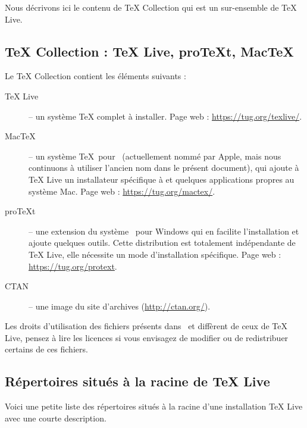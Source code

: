 \documentclass[german, english, french]{article}
\renewcommand{\TL}{\TeX{} Live\xspace}%
\renewcommand{\TK}{\TeX{} Collection\xspace}%
\begin{document}
Nous décrivons ici le contenu de \TK{} qui est un sur-ensemble de \TL.

\subsection {\protect\TK{} : \protect\TL, pro\protect\TeX{}t, Mac\protect\TeX}
\label{sec:tl-coll-dists}

Le \DVD{} \TK{} contient les éléments suivants :

\begin{description}

\item[\TL{}] -- un système \TeX{} complet à installer. Page web :
  \url{https://tug.org/texlive/}.

\item[Mac\TeX] -- un système \TeX\ pour \MacOSX\ (actuellement nommé par Apple,
  mais nous continuons à utiliser l'ancien nom dans le présent document), qui
  ajoute à \TL un installateur spécifique à \MacOSX{} et quelques applications
  propres au système Mac.  Page web : \url{https://tug.org/mactex/}.

\item[pro\TeX{}t] -- une extension du système \MIKTEX\ pour Windows qui en
  facilite l'installation et ajoute quelques outils. Cette distribution est
  totalement indépendante de \TL{}, elle nécessite un mode d'installation
  spécifique.  Page web : \url{https://tug.org/protext}.

\item[CTAN] -- une image du site d'archives \CTAN (\url{http://ctan.org/}).

\end{description}

Les droits d'utilisation des fichiers présents dans \CTAN\ et \ProTeXt{}
diffèrent de ceux de \TL{}, pensez à lire les licences si vous envisagez de
modifier ou de redistribuer certains de ces fichiers.

\subsection{Répertoires situés à la racine de \protect\TL{}}
\label{sec:tld}

Voici une petite liste des répertoires situés à la racine d'une installation \TL
avec une courte description.
\end{document}
